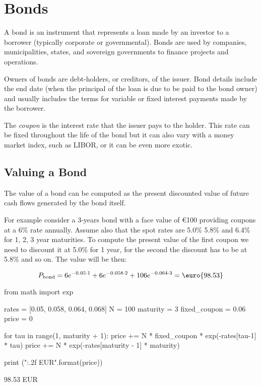 \chapter{Bonds}
\label{bonds}

A bond is an instrument that represents a loan made by an investor to a borrower (typically corporate or governmental). Bonds are used by companies, municipalities, states, and sovereign governments to finance projects and operations. 

Owners of bonds are debt-holders, or creditors, of the issuer. Bond details include the end date (when the principal of the loan is due to be paid to the bond owner) and usually includes the terms for variable or fixed interest payments made by the borrower.

The \emph{coupon} is the interest rate that the issuer pays to the holder. This rate can be fixed throughout the life of the bond but it can also vary with a money market index, such as LIBOR, or it can be even more exotic.

\section{Valuing a Bond}
\label{sec:bond_pricing}

The value of a bond can be computed as the present discounted value of future cash flows generated by the bond itself.

For example consider a 3-years bond with a face value of \euro{100} providing coupons at a 6\% rate annually. Assume also that the spot rates are 5.0\% 5.8\% and 6.4\% for 1, 2, 3 year maturities. To compute the present value of the first coupon we need to discount it at 5.0\% for 1 year, for the second the discount has to be at 5.8\% and so on. The value will be then:

\[P_{\mathrm{bond}}=6e^{-0.05\cdot 1}+6e^{-0.058\cdot 2}+106e^{-0.064\cdot 3} = \textrm{\euro{98.53}}\]

\begin{ipython}
from math import exp

rates = [0.05, 0.058, 0.064, 0.068]
N = 100
maturity = 3
fixed_coupon = 0.06
price = 0

for tau in range(1, maturity + 1):
    price += N * fixed_coupon * exp(-rates[tau-1] * tau)
price += N * exp(-rates[maturity - 1] * maturity)

print ("{:.2f} EUR".format(price))
\end{ipython}
\begin{ioutput}
98.53 EUR
\end{ioutput}

